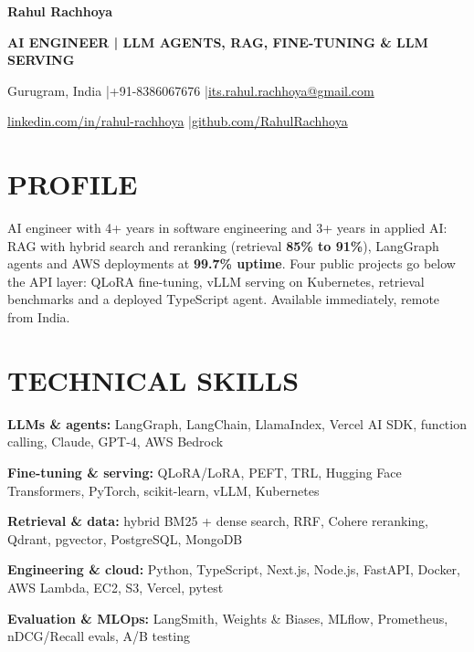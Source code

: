 \documentclass[10pt,a4paper]{article}
\begin{document}
\fontsize{10}{12.1}\selectfont
{\fontsize{27}{30}\selectfont\bfseries Rahul Rachhoya}\par
\vspace{5pt}

{\fontsize{9.1}{11}\selectfont\bfseries\color{accent} AI ENGINEER | LLM AGENTS, RAG, FINE-TUNING \& LLM SERVING}\par
\vspace{5pt}
{\fontsize{9}{11}\selectfont\color{muted}
Gurugram, India \enspace|\enspace +91-8386067676 \enspace|\enspace \href{mailto:its.rahul.rachhoya@gmail.com}{its.rahul.rachhoya@gmail.com}\par
\href{https://linkedin.com/in/rahul-rachhoya}{linkedin.com/in/rahul-rachhoya} \enspace|\enspace \href{https://github.com/RahulRachhoya}{github.com/RahulRachhoya}\par}
\section*{PROFILE}
AI engineer with 4+ years in software engineering and 3+ years in applied AI: RAG with hybrid search and reranking (retrieval \textbf{85\% to 91\%}), LangGraph agents and AWS deployments at \textbf{99.7\% uptime}. Four public projects go below the API layer: QLoRA fine-tuning, vLLM serving on Kubernetes, retrieval benchmarks and a deployed TypeScript agent. Available immediately, remote from India.\par
\section*{TECHNICAL SKILLS}
\textbf{LLMs \& agents:} LangGraph, LangChain, LlamaIndex, Vercel AI SDK, function calling, Claude, GPT-4, AWS Bedrock\par\vspace{2pt}
\textbf{Fine-tuning \& serving:} QLoRA/LoRA, PEFT, TRL, Hugging Face Transformers, PyTorch, scikit-learn, vLLM, Kubernetes\par\vspace{2pt}
\textbf{Retrieval \& data:} hybrid BM25 + dense search, RRF, Cohere reranking, Qdrant, pgvector, PostgreSQL, MongoDB\par\vspace{2pt}
\textbf{Engineering \& cloud:} Python, TypeScript, Next.js, Node.js, FastAPI, Docker, AWS Lambda, EC2, S3, Vercel, pytest\par\vspace{2pt}
\textbf{Evaluation \& MLOps:} LangSmith, Weights \& Biases, MLflow, Prometheus, nDCG/Recall evals, A/B testing\par
\end{document}
